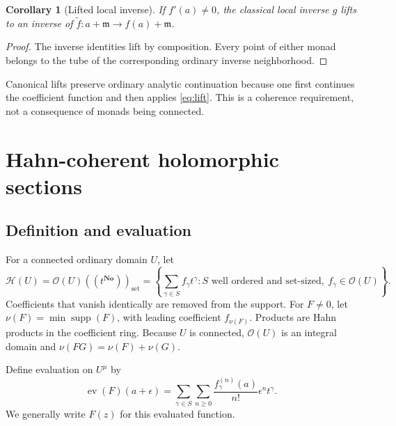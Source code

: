 \documentclass[11pt,oneside]{article}
\numberwithin{equation}{section}
\newtheorem{corollary}[theorem]{Corollary}
\theoremstyle{definition}
\theoremstyle{remark}\newtheorem{remark}[theorem]{Remark}
\newcommand{\No}{\mathbf{No}}
\newcommand{\OO}{\mathcal O}
\newcommand{\HH}{\mathscr H}
\newcommand{\m}{\mathfrak m}
\newcommand{\supp}{\operatorname{supp}}
\newcommand{\ev}{\operatorname{ev}}
\begin{document}
\begin{corollary}[Lifted local inverse]
If $f'(a)\ne0$, the classical local inverse $g$ lifts to an inverse of
$\widetilde f:a+\m\longrightarrow f(a)+\m$.
\end{corollary}
\begin{proof}
The inverse identities lift by composition. Every point of either monad
belongs to the tube of the corresponding ordinary inverse neighborhood.
\end{proof}
Canonical lifts preserve ordinary analytic continuation because one first
continues the coefficient function and then applies \eqref{eq:lift}. This
is a coherence requirement, not a consequence of monads being connected.

\section{Hahn-coherent holomorphic sections}\label{sec:coherent}
\subsection{Definition and evaluation}
For a connected ordinary domain $U$, let
\begin{equation}\label{eq:Hring}
 \HH(U)=\OO(U)((t^{\No}))_{\mathrm{set}}
 =\left\{\sum_{\gamma\in S}f_\gamma t^\gamma:
 S\text{ well ordered and set-sized},\ f_\gamma\in\OO(U)\right\}.
\end{equation}
Coefficients that vanish identically are removed from the support.
For $F\ne0$, let $\nu(F)=\min\supp(F)$, with leading coefficient
$f_{\nu(F)}$. Products are Hahn products in the coefficient ring.
Because $U$ is connected, $\OO(U)$ is an integral domain and
$\nu(FG)=\nu(F)+\nu(G)$.

Define evaluation on $U^\mu$ by
\begin{equation}\label{eq:Heval}
 \ev(F)(a+\epsilon)=
 \sum_{\gamma\in S}\sum_{n\geq0}
    \frac{f_\gamma^{(n)}(a)}{n!}\epsilon^n t^\gamma.
\end{equation}
We generally write $F(z)$ for this evaluated function.
\end{document}
